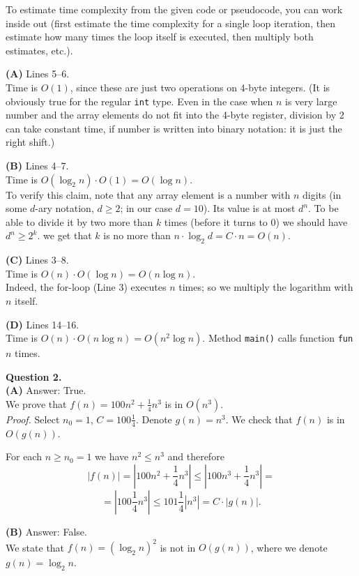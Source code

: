 \documentclass[a4paper,12pt]{article}
\begin{document}
To estimate time complexity from the given code or pseudocode, 
you can work inside out (first estimate the time complexity for 
a single loop iteration, then estimate how many times the loop itself is executed, 
then multiply both estimates, etc.). 


{\bf (A)} Lines 5--6.\\ 
Time is $O(1)$, since these are 
just two operations on 4-byte integers. 
(It is obviously true for the regular {\tt int} type. 
Even in the case when $n$ is very large number and the
array elements do not fit into the 4-byte register, 
division by $2$ can take constant time, if number is 
written into binary notation: it is just the right shift.)

{\bf (B)} Lines 4--7.\\
Time is $O(\log_2 n) \cdot O(1) = O(\log n)$.\\
To verify this claim, note that 
any array element is a number with $n$ digits 
(in some $d$-ary notation, $d \geq 2$; 
in our case $d = 10$). 
Its value is at most $d^n$. To be able to divide it by two
more than $k$ times (before it turns to $0$) we should 
have $d^n \geq 2^k$. we get that $k$ is no more than 
$n \cdot \log_2 d = C \cdot n =  O(n)$.

{\bf (C)} Lines 3--8.\\
Time is $O(n) \cdot  O(\log n) = O(n \log n)$.\\
Indeed, the for-loop (Line 3) executes $n$ times; 
so we multiply the logarithm with $n$ itself.

{\bf (D)} Lines 14--16.\\
Time is $O(n) \cdot O(n \log n) = O(n^2 \log n)$. 
Method {\tt main()} calls function {\tt fun} 
$n$ times.


\vspace{20pt}
{\bf Question 2.}\\
{\bf (A)} Answer: True.\\
We prove that $f(n) = 100n^2 + \frac{1}{4}n^3$ 
is in $O(n^3)$.\\
{\em Proof.} Select $n_0 = 1$, $C = 100\frac{1}{4}$.
Denote $g(n) = n^3$. We check that $f(n)$ is in $O(g(n))$. 

For each $n \geq n_0 =1$ we have $n^2 \leq n^3$ and therefore
$$|f(n)| = |100n^2 + \frac{1}{4}n^3| \leq |100n^3 + \frac{1}{4}n^3| =$$
$$= |100\frac{1}{4}n^3| \leq 101\frac{1}{4}|n^3| = C \cdot |g(n)|.$$


{\bf (B)} Answer: False.\\
We state that $f(n) = (\log_2 n)^2$
is not in $O(g(n))$, where we denote $g(n) = \log_2 n$. 
\end{document}
